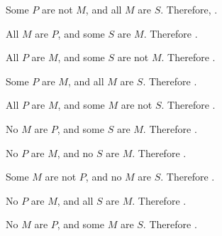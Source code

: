 \begin{exercises} 
\item Some $P$ are not $M$, and all $M$ are $S$. Therefore, \underline{\hspace{2cm}}. 
 
\item All $M$ are $P$, and some $S$ are $M$. Therefore \underline{\hspace{2cm}}. 
 
\item All $P$ are $M$, and some $S$ are not $M$. Therefore \underline{\hspace{2cm}}.
 
\item Some $P$ are $M$, and all $M$ are $S$. Therefore \underline{\hspace{2cm}}.
 
\item All $P$ are $M$, and some $M$ are not $S$. Therefore \underline{\hspace{2cm}}. 
 
\item No $M$ are $P$, and some $S$ are $M$. Therefore \underline{\hspace{2cm}}.
 
\item No $P$ are $M$, and no $S$ are $M$. Therefore \underline{\hspace{2cm}}. 
 
\item Some $M$ are not $P$, and no $M$ are $S$. Therefore \underline{\hspace{2cm}}. 
 
\item No $P$ are $M$, and all $S$ are $M$. Therefore \underline{\hspace{2cm}}. 
  
\item No $M$ are $P$, and some $M$ are $S$. Therefore \underline{\hspace{2cm}}.
 
\end{exercises}
    

